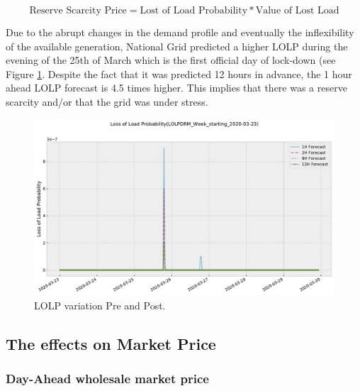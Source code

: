 \documentclass[energies,article,submit,moreauthors,pdftex]{Definitions/mdpi}
\begin{document}
\[ \text{Reserve Scarcity Price} = \text{Lost of Load Probability} * \text{Value of Lost Load} \]

Due to the abrupt changes in the demand profile and eventually the inflexibility of the available generation, National Grid predicted a higher LOLP during the evening of the 25th of March which is the first official day of lock-down (see Figure \ref{fig:LOLP_25_03}. Despite the fact that it was predicted 12 hours in advance, the 1 hour ahead LOLP forecast is 4.5 times higher. This implies that there was a reserve scarcity and/or that the grid was under stress.

\begin{figure}[H]\centering
\hspace{-25pt}\includegraphics[width=15 cm]{Graphics/LOLPDRM_Week_starting_2020-03-23no4H.pdf}
\caption{LOLP variation Pre and Post.}\label{fig:LOLP_25_03}
\end{figure}  



\subsection{The effects on Market Price}\label{section:Market price}

\subsubsection{Day-Ahead wholesale market price}\label{sec:day-ahead wholesale market price}
\end{document}
